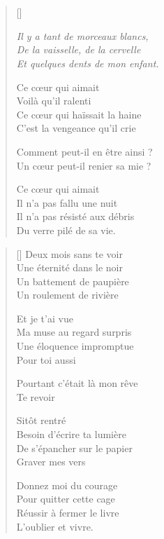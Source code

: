 \section{\hfill}

\settowidth{\versewidth}{Il n'a pas résisté aux débris}
\begin{verse}[\versewidth]

\emph{\hspace{7em}Il y a tant de morceaux blancs, \\
\hspace{7em}De la vaisselle, de la cervelle \\
\hspace{7em}Et quelques dents de mon enfant. \\}

Ce cœur qui aimait \\
Voilà qu'il ralenti \\
Ce cœur qui haïssait la haine \\
C'est la vengeance qu'il crie

Comment peut-il en être ainsi ? \\
Un cœur peut-il renier sa mie ?

Ce cœur qui aimait \\
Il n'a pas fallu une nuit \\
Il n'a pas résisté aux débris \\
Du verre pilé de sa vie.
\end{verse}

\newpage

\settowidth{\versewidth}{Pourtant c'était là mon rêve}
\begin{verse}[\versewidth]
Deux mois sans te voir \\
Une éternité dans le noir \\
Un battement de paupière \\
Un roulement de rivière

Et je t'ai vue \\
Ma muse au regard surpris \\
Une éloquence impromptue \\
Pour toi aussi

Pourtant c'était là mon rêve \\
Te revoir

Sitôt rentré \\
Besoin d'écrire ta lumière \\
De s'épancher sur le papier \\
Graver mes vers

Donnez moi du courage \\
Pour quitter cette cage \\
Réussir à fermer le livre \\
L'oublier et vivre.
\end{verse}

